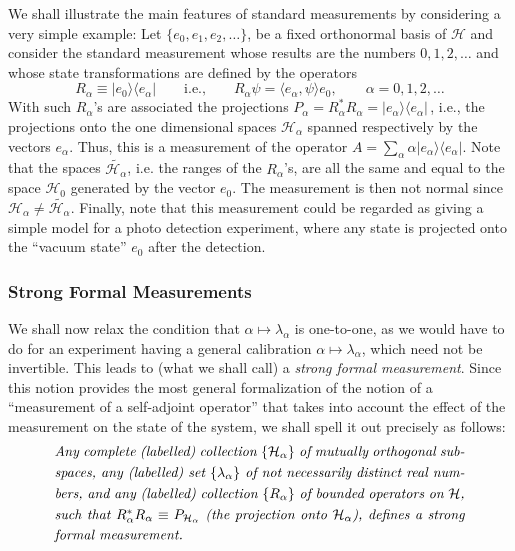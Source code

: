 \documentclass[12pt]{article}
\newcommand{\sa}{self-adjoint}
\renewcommand{\a}{\alpha}
\newcommand{\la}{\lambda_{\a}}
\newcommand{\Ha}{{\H}_{\a}}
\renewcommand{\H}{\mbox{$\mathcal{H}$}}
\newcommand{\Pa}{ P_{ {\mathcal{H}_{\a} } } }
\newcommand{\Aa}{R_{\a}}
\begin{document}
We shall illustrate the main features of standard measurements by
considering a very simple example: Let $\{e_0, e_{1}, e_{2}, \ldots
\}$, be a fixed orthonormal basis of \H{} and consider the standard
measurement whose results are the numbers $0,1,2,\ldots $ and whose
state transformations are defined by the operators
\begin{displaymath}
\Aa\equiv |e_0\rangle\langle e_\a| \qquad \mbox{i.e.,}\qquad
R_{\a} \psi = \langle e_\a, \psi \rangle
e_{0},\qquad\a=0,1,2,\ldots
\end{displaymath}
With such $\Aa$'s are associated the projections
$P_{\a}=\Aa^{\ast}\Aa=|e_\a\rangle\langle e_\a|\,$, i.e., the
projections onto the one dimensional spaces $\Ha$ spanned respectively
by the vectors $e_{\a}$.  Thus, this is a measurement of the operator
$ A = \sum_{\a} \a |e_\a\rangle\langle e_\a| $.  Note that the spaces
$\widetilde{\Ha}$, i.e.  the ranges of the $\Aa$'s, are all the same
and equal to the space $\H_{0}$ generated by the vector $e_0$. The
measurement is then not normal since $\Ha\neq \widetilde{\Ha}$.
Finally, note that this measurement could be regarded as giving a
simple model for a photo detection experiment, where any state is
projected onto the ``vacuum state'' $e_0$ after the detection.


\subsubsection{Strong Formal Measurements}
\label{sec:StrM}

We shall now relax the condition that $\a\mapsto \la$ is one-to-one,
as we would have to do for an experiment having a general calibration
$\a\mapsto\la$, which need not be invertible. This leads to (what we
shall call) a \emph{strong formal measurement}.  Since this notion
provides the most general formalization of the notion of a
``measurement of a \sa{} operator'' that takes into account the effect
of the measurement on the state of the system, we shall spell it out
precisely as follows:
\begin{equation}
\mbox{%
   \begin{minipage}{0.85\textwidth}\openup 1.4\jot
     \setlength{\baselineskip}{12pt}\emph{Any complete (labelled)
       collection $\{ \Ha\}$ of mutually orthogonal subspaces, any
       (labelled) set $\{\la \}$ of not necessarily distinct real
       numbers, and any (labelled) collection $\{\Aa\}$ of bounded
       operators on $\H$, such that $\Aa^{\ast}\Aa\equiv\Pa$ (the
       projection onto $\Ha$), defines a strong formal measurement.}
   \end{minipage}}
\label{def:sfm}
\end{equation}
\end{document}
